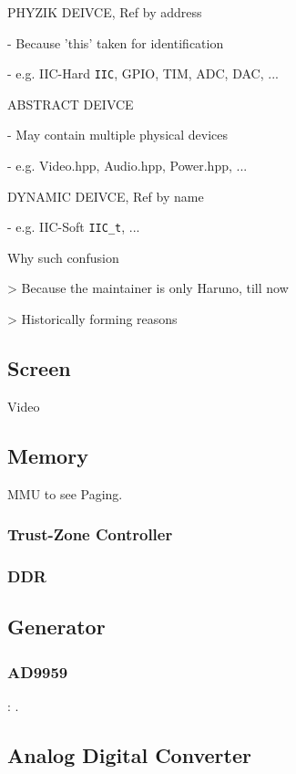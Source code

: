 

PHYZIK DEIVCE, Ref by address

- Because 'this' taken for identification

- e.g. IIC-Hard \verb`IIC`, GPIO, TIM, ADC, DAC, ...

ABSTRACT DEIVCE

- May contain multiple physical devices

- e.g. Video.hpp, Audio.hpp, Power.hpp, ...

DYNAMIC DEIVCE, Ref by name

- e.g. IIC-Soft \verb`IIC_t`, ...

Why such confusion

> Because the maintainer is only Haruno, till now

> Historically forming reasons

\subsection{Screen}
{Video}

\subsection{Memory}

MMU to see Paging.

\subsubsection{Trust-Zone Controller}

\subsubsection{DDR}

\subsection{Generator}

\subsubsection{AD9959}

: .

\subsection{Analog Digital Converter}

